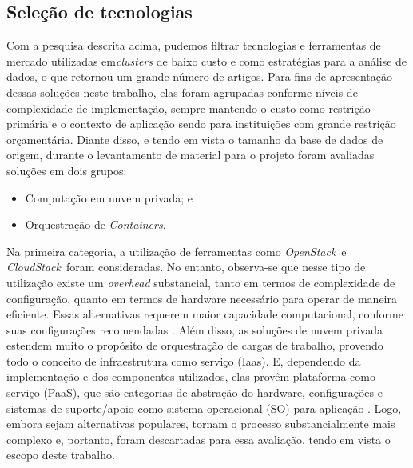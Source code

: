 \subsection{Seleção de tecnologias}

Com a pesquisa descrita acima, pudemos filtrar tecnologias e ferramentas de mercado utilizadas em\emph{clusters }de baixo custo e como estratégias para a análise de dados, o que retornou um grande número de artigos.  Para fins de apresentação dessas soluções neste trabalho, elas foram agrupadas conforme níveis de complexidade de implementação, sempre mantendo o custo como restrição primária e o contexto de aplicação sendo para instituições com grande restrição orçamentária.
Diante disso, e tendo em vista o tamanho da base de dados de origem, durante o levantamento de material para o projeto foram avaliadas soluções em dois grupos:

\begin{itemize}
    \item Computação em nuvem privada; e
    \item Orquestração de \emph{Containers}.
\end{itemize}



Na primeira categoria, a utilização de ferramentas como \emph{OpenStack}\textregistered \ e \emph{CloudStack}\textregistered \ foram consideradas. No entanto, observa-se que nesse tipo de utilização existe um \emph{overhead} substancial, tanto em termos de complexidade de configuração, quanto em termos de hardware necessário para operar de maneira eficiente. Essas alternativas requerem maior capacidade computacional, conforme suas configurações recomendadas \cite{cloudstack,openstack}. Além disso, as soluções de nuvem privada estendem muito o propósito de orquestração de cargas de trabalho, provendo todo o conceito de infraestrutura como serviço (Iaas). E, dependendo da implementação e dos componentes utilizados, elas provêm plataforma como serviço (PaaS), que são categorias de abstração do hardware, configurações e sistemas de suporte/apoio como sistema operacional (SO) para aplicação \cite{openstack,cloudstack,mell_nist_2011}. Logo, embora sejam alternativas populares, tornam o processo substancialmente mais complexo e, portanto, foram descartadas para essa avaliação, tendo em vista o escopo deste trabalho.

